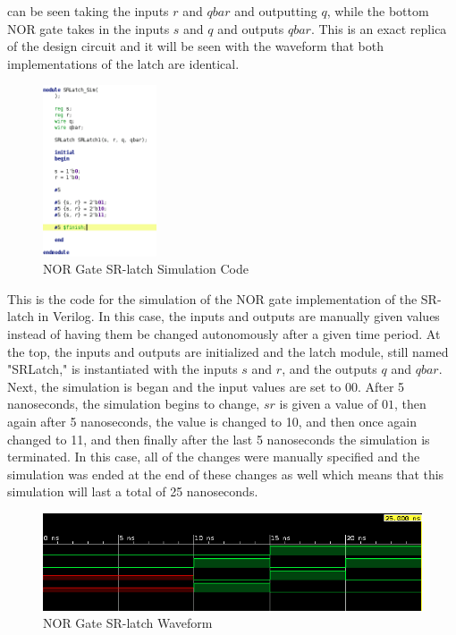 \documentclass[12pt]{article}
\begin{document}
    can be seen taking the inputs $r$ and $qbar$ and outputting $q$, while the
    bottom NOR gate takes in the inputs $s$ and $q$ and outputs $qbar$. This is
    an exact replica of the design circuit and it will be seen with the waveform
    that both implementations of the latch are identical.
    \newpage
    \begin{figure}[h]
        \centering
        \includegraphics[width=0.3\textwidth]{NOR Gate SRLatch Simulation Code.png}
        \caption{NOR Gate SR-latch Simulation Code}
    \end{figure}
    \par This is the code for the simulation of the NOR gate implementation of
    the SR-latch in Verilog. In this case, the inputs and outputs are manually
    given values instead of having them be changed autonomously after a given
    time period. At the top, the inputs and outputs are initialized and the
    latch module, still named "SRLatch," is instantiated with the inputs $s$ and
    $r$, and the outputs $q$ and $qbar$. Next, the simulation is began and the
    input values are set to 00. After 5 nanoseconds, the simulation begins to
    change, $s r$ is given a value of $01$, then again after 5 nanoseconds, the
    value is changed to 10, and then once again changed to 11, and then finally
    after the last 5 nanoseconds the simulation is terminated. In this case, all
    of the changes were manually specified and the simulation was ended at the
    end of these changes as well which means that this simulation will last a
    total of 25 nanoseconds.
    \begin{figure}[h]
        \centering
        \includegraphics[width=1.0\textwidth]{NOR Gate SRLatch Waveform.png}
        \caption{NOR Gate SR-latch Waveform}
    \end{figure}
\end{document}

